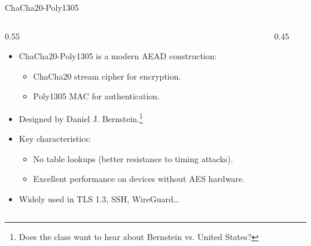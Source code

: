 \ifdefined\PRESENTATION\else\PassOptionsToClass{handout}{beamer}\fi\documentclass[aspectratio=169, lualatex]{beamer}
\begin{document}
\begin{frame}{ChaCha20-Poly1305}
	\begin{columns}[c]
		\begin{column}{0.55\textwidth}
			\begin{itemize}
				\item ChaCha20-Poly1305 is a modern AEAD construction:
				      \begin{itemize}
					      \item ChaCha20 stream cipher for encryption.
					      \item Poly1305 MAC for authentication.
				      \end{itemize}
				\item Designed by Daniel J. Bernstein.\footnote{Does the class want to hear about Bernstein vs. United States?}
				\item Key characteristics:
				      \begin{itemize}
					      \item No table lookups (better resistance to timing attacks).
					      \item Excellent performance on devices without AES hardware.
				      \end{itemize}
				\item Widely used in TLS 1.3, SSH, WireGuard\ldots
			\end{itemize}
		\end{column}
		\begin{column}{0.45\textwidth}
			\begin{center}
			\end{center}
		\end{column}
	\end{columns}
\end{frame}
\end{document}
